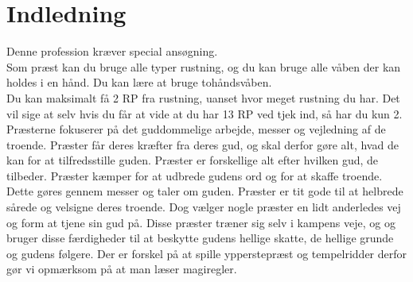 \chapter*{Indledning}
Denne profession kræver special ansøgning.\\
Som præst kan du bruge alle typer rustning, og du kan bruge alle våben der kan holdes i en hånd. Du kan lære at bruge tohåndsvåben.\\
Du kan maksimalt få 2 RP fra rustning, uanset hvor meget rustning du har. Det vil sige at selv hvis du får at vide at du har 13 RP ved tjek ind, så har du kun 2.\\

Præsterne fokuserer på det guddommelige arbejde, messer og vejledning af de troende.
Præster får deres kræfter fra deres gud, og skal derfor gøre alt, hvad de kan for at tilfredsstille
guden. Præster er forskellige alt efter hvilken gud, de tilbeder. Præster kæmper for at
udbrede gudens ord og for at skaffe troende. Dette gøres gennem messer og taler om
guden. Præster er tit gode til at helbrede sårede og velsigne deres troende. Dog vælger nogle præster
en lidt anderledes vej og form at tjene sin gud på. Disse præster træner sig selv i kampens veje, og og
bruger disse færdigheder til at beskytte gudens hellige skatte, de hellige grunde og gudens følgere.
Der er forskel på at spille ypperstepræst og tempelridder derfor gør vi opmærksom på at man
læser magiregler.

